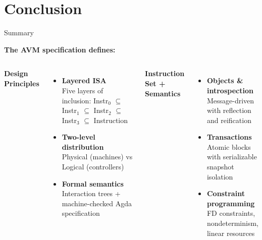 \documentclass[handout,aspectratio=169,xcolor=dvipsnames,10pt]{beamer}
\begin{document}



\section{Conclusion}

\begin{frame}{Summary}

\vfill

\textbf{The AVM specification defines:}

\vspace{0.5em}

\begin{columns}[T]
\textbf{Design Principles}

\begin{itemize}
  \item \textbf{Layered ISA} \\
  {\small Five layers of inclusion: Instr$_0$ $\subseteq$ Instr$_1$ $\subseteq$ Instr$_2$ $\subseteq$ Instr$_3$ $\subseteq$ Instruction}

  \item \textbf{Two-level distribution} \\
  {\small Physical (machines) vs Logical (controllers)}

  \item \textbf{Formal semantics} \\
  {\small Interaction trees + machine-checked Agda specification}
\end{itemize}

\textbf{Instruction Set + Semantics}

\begin{itemize}
  \item \textbf{Objects \& introspection} \\
  {\small Message-driven with reflection and reification}

  \item \textbf{Transactions} \\
  {\small Atomic blocks with serializable snapshot isolation}

  \item \textbf{Constraint programming} \\
  {\small FD constraints, nondeterminism, linear resources}


\end{itemize}
\end{columns}
\end{frame}
\end{document}
